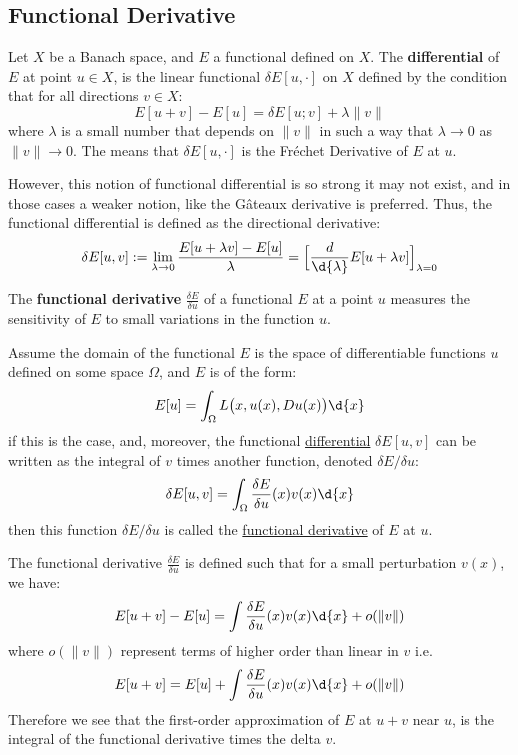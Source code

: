 \documentclass{article}
\begin{document}
\subsection{Functional Derivative}
\begin{definition} Let $X$  be a Banach space, and $E$ a functional defined on $X$. The \textbf{differential} of $E$ at point $u \in X$, is the linear functional $\delta E[u, \cdot ]$ on $X$ defined by the condition that for all directions $v \in X$:
\[
  E[u + v] - E[u]  = \delta E[u ; v] + \lambda \lVert v \rVert 
\]
where $\lambda$ is a small number that depends on $\lVert v \rVert$ in such a way that $\lambda \to 0$ as $\lVert v \rVert \to 0$. The means that $\delta E[u, \cdot ]$ is the Fréchet Derivative of $E$ at $u$.

However, this notion of functional differential is so strong it may not exist, and in those cases a weaker notion, like the Gâteaux derivative is preferred. Thus, the functional differential is defined as the directional derivative:
\[
  \delta E[u, v] := \lim_{\lambda \to 0} \frac{E[u + \lambda v] -E[u]}{\lambda} = \Big[ \frac{d}{\d{\lambda}} E[u + \lambda v] \Big]_{\lambda = 0}
\]
\end{definition}

\begin{definition} The \textbf{functional derivative}  $\frac{\delta E}{\delta u}$ of a functional $E$ at a point $u$ measures the sensitivity of $E$ to small variations in the function $u$. 

  Assume the domain of the functional $E$ is the space of differentiable functions $u$ defined on some space $\Omega$, and $E$ is of the form:
\[
  E[u] = \int_{\Omega} L \big( x, u (x), D u(x) \big) \d{x}
\]
  if this is the case, and, moreover, the functional \ul{differential} $\delta E[u, v]$ can be written as the integral of $v$ times another function, denoted $\delta E / \delta u$:
\[
  \delta E[u, v] = \int_{\Omega} \frac{\delta E}{\delta u} (x) v(x) \d{x}
\]
then this function $\delta E / \delta u$ is called the \ul{functional derivative} of $E$ at $u$. 
\end{definition}

\begin{remark} The functional derivative $\frac{\delta E}{\delta u}$ is defined such that for a small perturbation $v(x)$, we have:
\[
  E[u+ v] - E[u] = \int \frac{\delta E}{\delta u}(x) v(x) \d{x} + o( \lVert  v \rVert  )
\]
where $o ( \lVert  v \rVert  )$ represent terms of higher order than linear in $v$
i.e. 
\[
  E[u+ v] = E[u] + \int \frac{\delta E}{\delta u}(x) v(x) \d{x} + o( \lVert v \rVert  )
\]
Therefore we see that the first-order approximation of $E$ at $u+v$ near $u$, is the integral of the functional derivative times the delta $v$.  
\end{remark}
\end{document}
